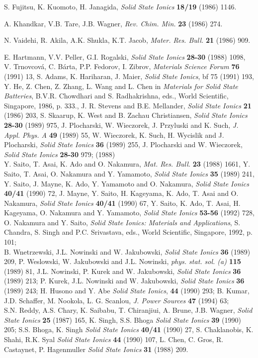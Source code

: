 \documentclass{elsart}
\begin{document}
\begin{thebibliography}{999}
 S. Fujitsu, K. Kuomoto, H. Janagida, {\em Solid State Ionics\/}
{\bf 18/19} (1986) 1146.

 A. Khandkar, V.B. Tare, J.B. Wagner, {\em Rev. Chim. Min.\/} {\bf
23} (1986) 274.

 N. Vaidehi, R. Akila, A.K. Shukla, K.T. Jacob, {\em Mater. Res.
Bull.\/} {\bf 21} (1986) 909.

 E. Hartmann, V.V. Peller, G.I. Rogalski, {\em Solid State
    Ionics\/} {\bf 28-30} (1988) 1098, 
V. Trnovcov\'a, C. B\'arta, P.P. Fedorov, I. Zibrov, {\em Materials Science
  Forum\/} {\bf 76} (1991) 13, 
S. Adams, K. Hariharan, J. Maier, {\em Solid State Ionics\/}, {bf 75} (1991)
193, Y. He, Z. Chen, Z. Zhang, L. Wang and L. Chen in {\em Materials for Solid 
  State Batteries\/}, B.V.R. Chowdhari and S. Radhakrishna, eds., World
Scientific, Singapore, 1986, p. 333.,  
J. R. Stevens and B.E. Mellander, {\em Solid State Ionics\/} {\bf 21}
(1986) 203, 
S. Skaarup, K. West and B. Zachau Christiansen, {\em Solid State
  Ionics\/} {\bf 28-30} (1989) 975, 
J. Plocharski, W. Wieczorek, J. Przyluski and K. Such, {\em J. Appl. Phys. A\/}
{\bf 49} (1989) 55,  
W. Wieczorek, K. Such, H. Wycislik and J. Plocharski, {\em Solid State Ionics\/}
{\bf 36} (1989) 255, 
J. Plocharski and W. Wieczorek, {\em Solid State Ionics\/} {\bf 28-30} 979;
(1988) \\ 
Y. Saito, T. Asai, K. Ado and O. Nakamura, {\em Mat. Res. Bull.\/} {\bf 23}
(1988) 1661, 
Y. Saito, T. Asai, O. Nakamura and Y. Yamamoto, {\em Solid State Ionics\/} {\bf
  35} (1989) 241,  
Y. Saito, J. Mayne, K. Ado, Y. Yamamoto and O. Nakamura, {\em Solid State
  Ionics\/} {\bf 40/41} (1990) 72,  
J. Mayne, Y. Saito, H. Kageyama, K. Ado, T. Asai and O. Nakamura, {\em Solid
  State Ionics\/} {\bf 40/41} (1990) 67, 
Y. Saito, K. Ado, T. Asai, H. Kageyama, O. Nakamura and Y. Yamamoto, {\em Solid
  State Ionics\/} {\bf 53-56} (1992) 728,  
O. Nakamura and Y. Saito, {\em Solid State Ionics: Materials and
  Applications\/}, S. Chandra, S. Singh and P.C. Srivastava, eds., World
Scientific, Singapore, 1992, p. 101;\\  
B. Wnetrzewski, J.L. Nowinski and W. Jakubowski, {\em Solid State Ionics\/}
{\bf 36} (1989) 209, 
P. Weslowski, W. Jakubowski and J.L. Nowinski, {\em phys. stat. sol. (a)\/}
{\bf 115} (1989) 81,  
J.L. Nowinski, P. Kurek and W. Jakubowski, {\em Solid State Ionics\/} {\bf 36} 
(1989) 213;  
P. Kurek, J.L. Nowinski and W. Jakubowski, {\em Solid State Ionics\/} {\bf 36} 
(1989) 243;  
H. Husono and Y. Abe {\em Solid State Ionics\/}, {\bf 44} (1990) 293;
B. Kumar, J.D. Schaffer, M. Nookola, L. G. Scanlou, {\em J. Power Sources\/}
{\bf 47} (1994) 63;\\
S.N. Reddy, A.S. Chary, K. Saibabu, T. Chiranjiui, A. Brune, J.B. Wagner,
{\em Solid State Ionics\/} {\bf 25} (1987) 165,  
K. Singh, S.S. Bhoga {\em Solid State Ionics\/} {\bf 39} (1990) 205; 
S.S. Bhoga, K. Singh {\em Solid State Ionics\/} {\bf 40/41} (1990) 27,  
S. Chaklanobis, K. Shahi, R.K. Syal {\em Solid State Ionics\/} {\bf 44} (1990)
107,  
L. Chen, C. Gros, R. Castaynet, P. Hagenmuller {\em Solid State Ionics\/} {\bf
  31} (1988) 209.   


\end{thebibliography}
\end{document}
